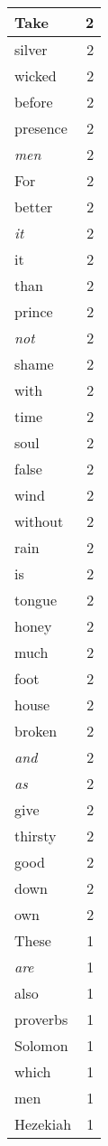 \begin{center}
\begin{longtable}{l|r}
Take & 2\\ \hline 
silver & 2\\ \hline 
wicked & 2\\ \hline 
before & 2\\ \hline 
presence & 2\\ \hline 
\emph{men} & 2\\ \hline 
For & 2\\ \hline 
better & 2\\ \hline 
\emph{it} & 2\\ \hline 
it & 2\\ \hline 
than & 2\\ \hline 
prince & 2\\ \hline 
\emph{not} & 2\\ \hline 
shame & 2\\ \hline 
with & 2\\ \hline 
time & 2\\ \hline 
soul & 2\\ \hline 
false & 2\\ \hline 
wind & 2\\ \hline 
without & 2\\ \hline 
rain & 2\\ \hline 
is & 2\\ \hline 
tongue & 2\\ \hline 
honey & 2\\ \hline 
much & 2\\ \hline 
foot & 2\\ \hline 
house & 2\\ \hline 
broken & 2\\ \hline 
\emph{and} & 2\\ \hline 
\emph{as} & 2\\ \hline 
give & 2\\ \hline 
thirsty & 2\\ \hline 
good & 2\\ \hline 
down & 2\\ \hline 
own & 2\\ \hline 
These & 1\\ \hline 
\emph{are} & 1\\ \hline 
also & 1\\ \hline 
proverbs & 1\\ \hline 
Solomon & 1\\ \hline 
which & 1\\ \hline 
men & 1\\ \hline 
Hezekiah & 1\\ \hline 

\end{longtable}
\end{center}
